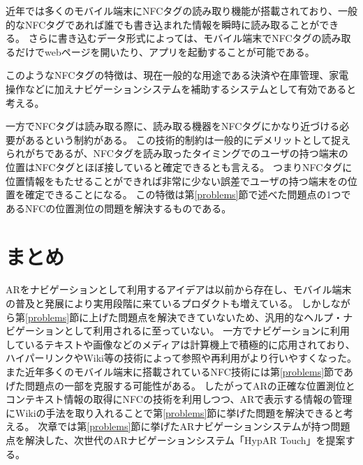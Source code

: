 近年では多くのモバイル端末にNFCタグの読み取り機能が搭載されており、一般的なNFCタグであれば誰でも書き込まれた情報を瞬時に読み取ることができる。
さらに書き込むデータ形式によっては、モバイル端末でNFCタグの読み取るだけでwebページを開いたり、アプリを起動することが可能である。

このようなNFCタグの特徴は、現在一般的な用途である決済や在庫管理、家電操作などに加えナビゲーションシステムを補助するシステムとして有効であると考える。

一方でNFCタグは読み取る際に、読み取る機器をNFCタグにかなり近づける必要があるという制約がある。
この技術的制約は一般的にデメリットとして捉えられがちであるが、NFCタグを読み取ったタイミングでのユーザの持つ端末の位置はNFCタグとほぼ接していると確定できるとも言える。
つまりNFCタグに位置情報をもたせることができれば非常に少ない誤差でユーザの持つ端末をの位置を確定できることになる。
この特徴は第\ref{problems}節で述べた問題点の1つであるNFCの位置測位の問題を解決するものである。



\section{まとめ}
ARをナビゲーションとして利用するアイデアは以前から存在し、モバイル端末の普及と発展により実用段階に来ているプロダクトも増えている。
しかしながら第\ref{problems}節に上げた問題点を解決できていないため、汎用的なヘルプ・ナビゲーションとして利用されるに至っていない。
一方でナビゲーションに利用しているテキストや画像などのメディアは計算機上で積極的に応用されており、ハイパーリンクやWiki等の技術によって参照や再利用がより行いやすくなった。
また近年多くのモバイル端末に搭載されているNFC技術には第\ref{problems}節であげた問題点の一部を克服する可能性がある。
したがってARの正確な位置測位とコンテキスト情報の取得にNFCの技術を利用しつつ、ARで表示する情報の管理にWikiの手法を取り入れることで第\ref{problems}節に挙げた問題を解決できると考える。
次章では第\ref{problems}節に挙げたARナビゲーションシステムが持つ問題点を解決した、次世代のARナビゲーションシステム「HypAR Touch」を提案する。